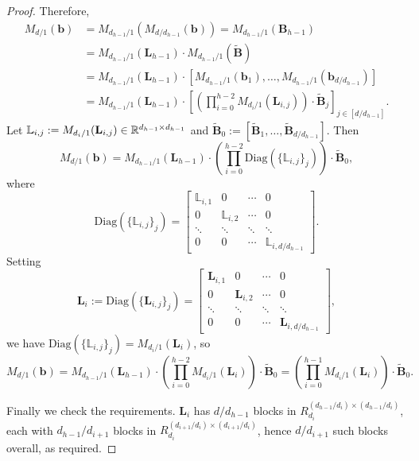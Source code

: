\begin{proof}
	Therefore,
	\begin{align*}
		M_{d/1}(\mathbf{b}) &= M_{d_{h-1}/1}(M_{d/d_{h-1}}(\mathbf{b})) = M_{d_{h-1}/1}(\mathbf{B}_{h-1}) \\
		&= M_{d_{h-1}/1}(\mathbf{L}_{h-1}) \cdot M_{d_{h-1}/1}(\tilde{\mathbf{B}}) \\
		&= M_{d_{h-1}/1}(\mathbf{L}_{h-1}) \cdot [M_{d_{h-1}/1}(\mathbf{b}_1), \dots, M_{d_{h-1}/1}(\mathbf{b}_{d/d_{h-1}})] \\
		&= M_{d_{h-1}/1}(\mathbf{L}_{h-1}) \cdot \left[ \left( \prod_{i=0}^{h-2} M_{d_i/1}(\mathbf{L}_{i,j}) \right) \cdot \tilde{\mathbf{B}}_j \right]_{j \in [d/d_{h-1}]}.
	\end{align*}
	Let $\mathbb{L}_{i,j} := M_{d_i/1}(\mathbf{L}_{i,j}) \in \mathbb{R}^{d_{h-1} \times d_{h-1}}$ and $\tilde{\mathbf{B}}_0 := [\tilde{\mathbf{B}}_1, \dots, \tilde{\mathbf{B}}_{d/d_{h-1}}]$. Then
	\[
		M_{d/1}(\mathbf{b}) = M_{d_{h-1}/1}(\mathbf{L}_{h-1}) \cdot \left( \prod_{i=0}^{h-2} \mathrm{Diag}(\{\mathbb{L}_{i,j}\}_j) \right) \cdot \tilde{\mathbf{B}}_0,
	\]
	where
	\[
		\mathrm{Diag}(\{\mathbb{L}_{i,j}\}_j) = \begin{bmatrix}
			\mathbb{L}_{i,1} & 0 & \cdots & 0 \\
			0 & \mathbb{L}_{i,2} & \cdots & 0 \\
			\ddots & \ddots & \ddots & \ddots \\
			0 & 0 & \cdots & \mathbb{L}_{i,d/d_{h-1}}
		\end{bmatrix}.
	\]
	Setting
	\[
		\mathbf{L}_i := \mathrm{Diag}(\{\mathbf{L}_{i,j}\}_j) = \begin{bmatrix}
			\mathbf{L}_{i,1} & 0 & \cdots & 0 \\
			0 & \mathbf{L}_{i,2} & \cdots & 0 \\
			\ddots & \ddots & \ddots & \ddots \\
			0 & 0 & \cdots & \mathbf{L}_{i,d/d_{h-1}}
		\end{bmatrix},
	\]
	we have $\mathrm{Diag}(\{\mathbb{L}_{i,j}\}_j) = M_{d_i/1}(\mathbf{L}_i)$, so
	\[
		M_{d/1}(\mathbf{b}) = M_{d_{h-1}/1}(\mathbf{L}_{h-1}) \cdot \left( \prod_{i=0}^{h-2} M_{d_i/1}(\mathbf{L}_i) \right) \cdot \tilde{\mathbf{B}}_0 = \left( \prod_{i=0}^{h-1} M_{d_i/1}(\mathbf{L}_i) \right) \cdot \tilde{\mathbf{B}}_0.
	\]

	Finally we check the requirements. $\mathbf{L}_i$ has $d/d_{h-1}$ blocks in $R_{d_i}^{(d_{h-1}/d_i) \times (d_{h-1}/d_i)}$, each with $d_{h-1}/d_{i+1}$ blocks in $R_{d_i}^{(d_{i+1}/d_i) \times (d_{i+1}/d_i)}$, hence $d/d_{i+1}$ such blocks overall, as required.


\end{proof}
